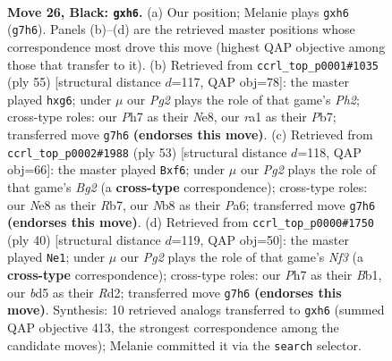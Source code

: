 \documentclass[11pt]{article}
\begin{document}
\clearpage

\begin{figure}[p]\centering
\begin{subfigure}{0.46\textwidth}\centering
\resizebox{\linewidth}{!}{%
\newchessgame
\chessboard[
  setfen={rnb1nk2/1p4pp/1q5B/p2B1p1P/P1PN3P/8/8/RN1Q2K1 b - - 0 26},
  showmover=false,
  pgfstyle=straightmove, color=movearrow, markmove={g7-h6}
]}
\caption{}
\end{subfigure}\hfill
\begin{subfigure}{0.46\textwidth}\centering
\resizebox{\linewidth}{!}{%
\newchessgame
\chessboard[
  setfen={4n1k1/1pr2ppp/p5B1/3p2P1/P5Q1/2q2NP1/2P2PK1/1R6 b - - 0 28},
  showmover=false,
  pgfstyle=straightmove, color=movearrow, markmove={h7-g6}
]}
\caption{}
\end{subfigure}
\\[4pt]
\begin{subfigure}{0.46\textwidth}\centering
\resizebox{\linewidth}{!}{%
\newchessgame
\chessboard[
  setfen={8/1r2ppbk/p1q2B1p/1p3P2/3Q4/P1N4P/1PP3P1/1R5K b - - 0 27},
  showmover=false,
  pgfstyle=straightmove, color=movearrow, markmove={g7-f6}
]}
\caption{}
\end{subfigure}\hfill
\begin{subfigure}{0.46\textwidth}\centering
\resizebox{\linewidth}{!}{%
\newchessgame
\chessboard[
  setfen={5r1k/1pqb3p/3p1p2/r3nP2/P3Q3/5N2/3R1PPP/RB4K1 w - - 1 21},
  showmover=false,
  pgfstyle=straightmove, color=movearrow, markmove={f3-e1}
]}
\caption{}
\end{subfigure}
\caption{\textbf{Move 26, Black: \texttt{gxh6}.} (a) Our position; Melanie plays \texttt{gxh6} (\texttt{g7h6}). Panels (b)--(d) are the retrieved master positions whose correspondence most drove this move (highest QAP objective among those that transfer to it). (b) Retrieved from \texttt{ccrl\_top\_p0001\#1035} (ply 55) [structural distance $d$=117, QAP obj=78]: the master played \texttt{hxg6}; under $\mu$ our \emph{Pg2} plays the role of that game's \emph{Ph2}; cross-type roles: our \emph{P}h7 as their \emph{N}e8, our \emph{r}a1 as their \emph{P}b7; transferred move \texttt{g7h6} \textbf{(endorses this move)}. (c) Retrieved from \texttt{ccrl\_top\_p0002\#1988} (ply 53) [structural distance $d$=118, QAP obj=66]: the master played \texttt{Bxf6}; under $\mu$ our \emph{Pg2} plays the role of that game's \emph{Bg2} (a \textbf{cross-type} correspondence); cross-type roles: our \emph{N}e8 as their \emph{R}b7, our \emph{N}b8 as their \emph{P}a6; transferred move \texttt{g7h6} \textbf{(endorses this move)}. (d) Retrieved from \texttt{ccrl\_top\_p0000\#1750} (ply 40) [structural distance $d$=119, QAP obj=50]: the master played \texttt{Ne1}; under $\mu$ our \emph{Pg2} plays the role of that game's \emph{Nf3} (a \textbf{cross-type} correspondence); cross-type roles: our \emph{P}h7 as their \emph{B}b1, our \emph{b}d5 as their \emph{R}d2; transferred move \texttt{g7h6} \textbf{(endorses this move)}. Synthesis: 10 retrieved analogs transferred to \texttt{gxh6} (summed QAP objective 413, the strongest correspondence among the candidate moves); Melanie committed it via the \texttt{search} selector.}
\label{fig:thought-m51}
\end{figure}
\end{document}
